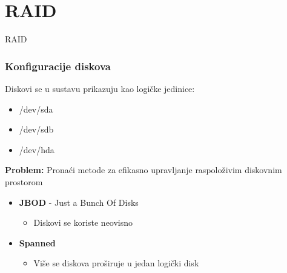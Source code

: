 \documentclass[t]{beamer}
\begin{document}
\section{RAID}

\begin{frame}
	\vspace*{\fill}
		\begin{center}
			\Huge{RAID}
		\end{center}
	\vspace*{\fill}
\end{frame}

\begin{frame}
	\frametitle{Konfiguracije diskova}
	Diskovi se u sustavu prikazuju kao logičke jedinice:
	{\ttfamily
		\begin{itemize}
			\item[] /dev/sda
			\item[] /dev/sdb
			\item[] /dev/hda
		\end{itemize}
	}
	\textbf{Problem:} Pronaći metode za efikasno upravljanje raspoloživim diskovnim prostorom
	\vfill
	\begin{itemize}
		\item \textbf{JBOD} - Just a Bunch Of Disks
		\begin{itemize}
			\item Diskovi se koriste neovisno
		\end{itemize}
		\item \textbf{Spanned}
		\begin{itemize}
			\item Više se diskova proširuje u jedan logički disk
		\end{itemize}
	\end{itemize}
\end{frame}
\end{document}

